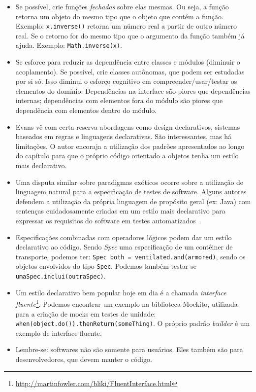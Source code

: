 \documentclass[a4paper, 12pt]{article}
\newcommand{\code}[1]{\texttt{#1}}
\begin{document}
\begin{itemize}
\item Se possível, crie funções \emph{fechadas} sobre elas mesmas. Ou seja, a função retorna um objeto do mesmo tipo que o objeto que contém a função. Exemplo: \code{x.inverse()} retorna um número real a partir de outro número real. Se o retorno for do mesmo tipo que o argumento da função também já ajuda. Exemplo: \code{Math.inverse(x)}.

\item Se esforce para reduzir as dependência entre classes e módulos (diminuir o acoplamento). Se possível, crie classes autônomas, que podem ser estudadas por si só. Isso diminui o esforço cognitivo em compreender/usar/testar os elementos do domínio. Dependências na interface são piores que dependências internas; dependências com elementos fora do módulo são piores que dependência com elementos dentro do módulo.

\item Evans vê com certa reserva abordagens como design declarativos, sistemas baseados em regras e linguagens declarativas. São interessantes, mas há limitações. O autor encoraja a utilização dos padrões apresentados ao longo do capítulo para que o próprio código orientado a objetos tenha um estilo mais declarativo. 

\item Uma disputa similar sobre paradigmas exóticos ocorre sobre a utilização de linguagem natural para a especificação de testes de software. Alguns autores defendem a utilização da própria linguagem de propósito geral (ex: Java) com sentenças cuidadosamente criadas em um estilo mais declarativo para expressar os requisitos do software em testes automatizados~\cite{Freeman2009Tests}.

\item Especificações combinadas com operadores lógicos podem dar um estilo declarativo ao código. Sendo \emph{Spec} uma especificação de um contêiner de transporte, podemos ter: \code{Spec both = ventilated.and(armored)}, sendo os objetos envolvidos do tipo \code{Spec}. Podemos também testar se \code{umaSpec.inclui(outraSpec)}. 

\item Um estilo declarativo bem popular hoje em dia é a chamada \emph{interface fluente}\footnote{\url{http://martinfowler.com/bliki/FluentInterface.html}}. Podemos encontrar um exemplo na biblioteca Mockito, utilizada para a criação de mocks em testes de unidade: \code{when(object.do()).thenReturn(someThing)}. O próprio padrão \emph{builder} é um exemplo de interface fluente.

\item Lembre-se: softwares não são somente para usuários. Eles também são para desenvolvedores, que devem manter o código.



\end{itemize}
\end{document}
